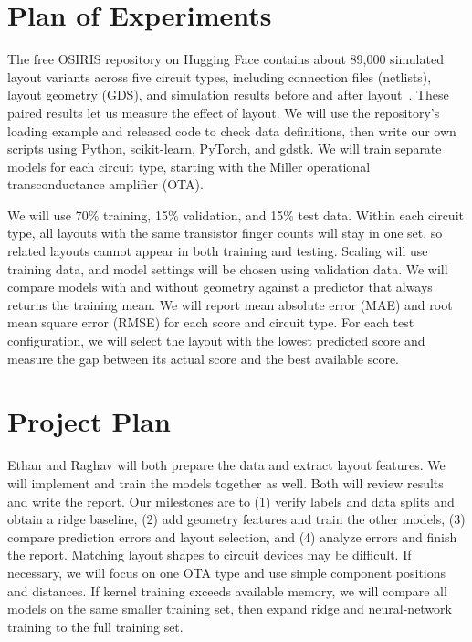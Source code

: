 \documentclass[11pt,letterpaper]{article}
\begin{document}
\section*{Plan of Experiments}

The free OSIRIS repository on Hugging Face contains about 89,000 simulated layout
variants across five circuit types, including connection files (netlists), layout
geometry (GDS), and simulation results before and after layout~\cite{dataset}.
These paired results let us measure the effect of layout. We will use the
repository's loading example and released code to check data definitions, then
write our own scripts using Python, scikit-learn, PyTorch, and gdstk.
We will train separate models for each circuit type, starting with the Miller
operational transconductance amplifier (OTA).

We will use 70\% training, 15\% validation, and 15\% test data. Within each circuit
type, all layouts with the same transistor finger counts will stay in one set,
so related layouts cannot appear in both training and testing.
Scaling will use training data, and model settings will be chosen using
validation data. We will compare models with and without geometry against a
predictor that always returns the training mean. We will report mean absolute
error (MAE) and root mean square error (RMSE) for each score and circuit type.
For each test configuration, we will select the layout with the lowest predicted
score and measure the gap between its actual score and the best available score.

\section*{Project Plan}

Ethan and Raghav will both prepare the data and extract layout features. We will implement
and train the models together as well. Both will review results and write the report.
Our milestones are to (1) verify labels and data splits and obtain a ridge
baseline, (2) add geometry features and train the other models,
(3) compare prediction errors and layout selection, and (4) analyze errors and
finish the report.
Matching layout shapes to circuit devices may be difficult. If necessary, we
will focus on one OTA type and use simple component positions and distances.
If kernel training exceeds available memory, we will compare all models on
the same smaller training set, then expand ridge and neural-network training
to the full training set.
\end{document}
